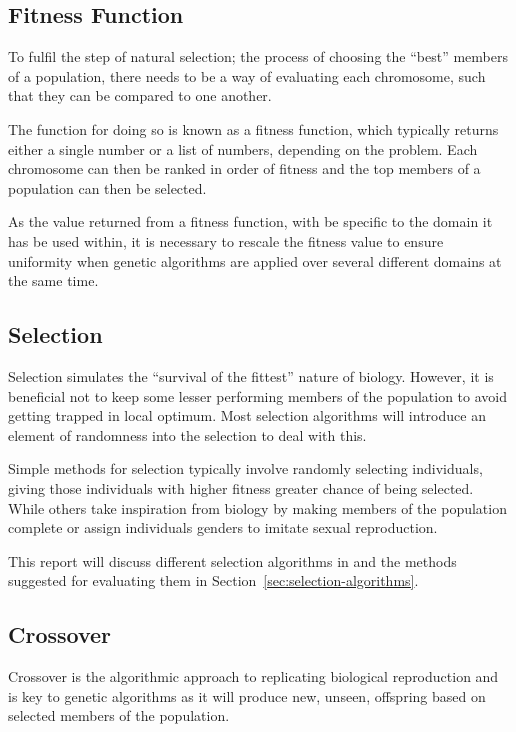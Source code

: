 \documentclass[10pt, a4paper]{article}
\begin{document}
\subsection{Fitness Function}
To fulfil the step of natural selection; the process of choosing the ``best''
members of a population, there needs to be a way of evaluating each chromosome,
such that they can be compared to one another.

The function for doing so is known as a fitness function, which typically 
returns either a single number or a list of numbers, depending on the problem.
Each chromosome can then be ranked in order of fitness and the top members of
a population can then be selected.

As the value returned from a fitness function, with be specific to the domain 
it has be used within, it is necessary to rescale the fitness value to ensure 
uniformity when genetic algorithms are applied over several different domains
at the same time. %


\subsection{Selection}
Selection simulates the ``survival of the fittest'' nature of biology. However,
it is beneficial not to keep some lesser performing members of the population
to avoid getting trapped in local optimum. Most selection algorithms will 
introduce an element of randomness into the selection to deal with this.

Simple methods for selection typically involve randomly selecting individuals,
giving those individuals with higher fitness greater chance of being selected.
While others take inspiration from biology by making members of the population
complete or assign individuals genders to imitate sexual reproduction.

This report will discuss different selection algorithms in 
and the methods suggested for evaluating them in 
Section~\ref{sec:selection-algorithms}.

\subsection{Crossover}

Crossover is the algorithmic approach to replicating biological reproduction
and is key to genetic algorithms as it will produce new, unseen, offspring
based on selected members of the population.
\end{document}
